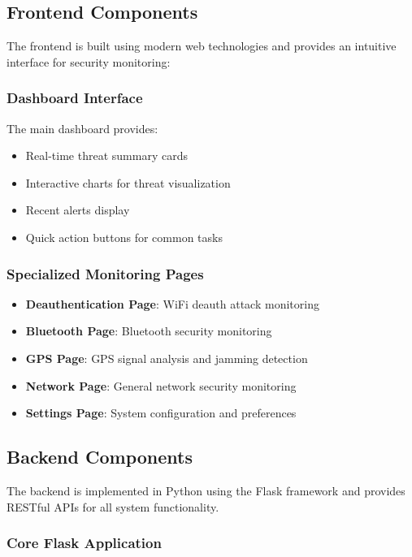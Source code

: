 \documentclass[12pt,a4paper]{report}
\begin{document}
\subsection{Frontend Components}

The frontend is built using modern web technologies and provides an intuitive interface for security monitoring:

\subsubsection{Dashboard Interface}
The main dashboard provides:
\begin{itemize}
    \item Real-time threat summary cards
    \item Interactive charts for threat visualization
    \item Recent alerts display
    \item Quick action buttons for common tasks
\end{itemize}

\subsubsection{Specialized Monitoring Pages}
\begin{itemize}
    \item \textbf{Deauthentication Page}: WiFi deauth attack monitoring
    \item \textbf{Bluetooth Page}: Bluetooth security monitoring
    \item \textbf{GPS Page}: GPS signal analysis and jamming detection
    \item \textbf{Network Page}: General network security monitoring
    \item \textbf{Settings Page}: System configuration and preferences
\end{itemize}

\subsection{Backend Components}

The backend is implemented in Python using the Flask framework and provides RESTful APIs for all system functionality.

\subsubsection{Core Flask Application}
\end{document}
